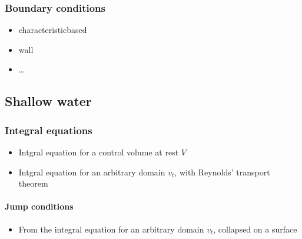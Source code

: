 \documentclass[letterpaper,10pt,english]{jupyterBook}
\begin{document}
\subsubsection{Boundary conditions}
\label{\detokenize{ch/pde/hyperbolic-nd-euler:boundary-conditions}}\label{\detokenize{ch/pde/hyperbolic-nd-euler:pde-hyperbolic-nd-euler-bc}}\begin{itemize}
\item {} 
\sphinxAtStartPar
characteristic\sphinxhyphen{}based

\item {} 
\sphinxAtStartPar
wall

\item {} 
\sphinxAtStartPar
…

\end{itemize}

\sphinxstepscope


\subsection{Shallow water}
\label{\detokenize{ch/pde/hyperbolic-nd-shallow-water:shallow-water}}\label{\detokenize{ch/pde/hyperbolic-nd-shallow-water:pde-hyperbolic-nd-shallow-water}}\label{\detokenize{ch/pde/hyperbolic-nd-shallow-water::doc}}

\subsubsection{Integral equations}
\label{\detokenize{ch/pde/hyperbolic-nd-shallow-water:integral-equations}}\label{\detokenize{ch/pde/hyperbolic-nd-shallow-water:pde-hyperbolic-nd-shallow-water-integral}}\begin{itemize}
\item {} 
\sphinxAtStartPar
Intgral equation for a control volume at rest \(V\)

\item {} 
\sphinxAtStartPar
Intgral equation for an arbitrary domain \(v_t\), with Reynolds’ transport theorem

\end{itemize}


\paragraph{Jump conditions}
\label{\detokenize{ch/pde/hyperbolic-nd-shallow-water:jump-conditions}}\label{\detokenize{ch/pde/hyperbolic-nd-shallow-water:pde-hyperbolic-nd-shallow-water-integral-jump}}\begin{itemize}
\item {} 
\sphinxAtStartPar
From the integral equation for an arbitrary domain \(v_t\), collapsed on a surface

\end{itemize}
\end{document}
